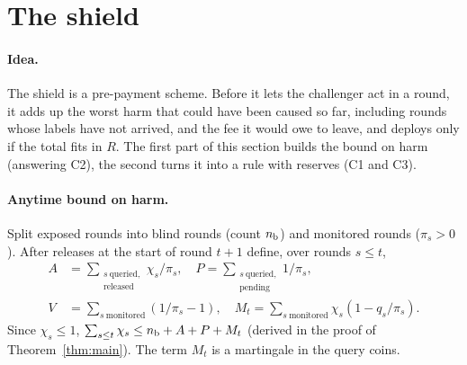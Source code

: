 \documentclass[10pt]{article}
\theoremstyle{plain}
\theoremstyle{definition}
\begin{document}
\section{The shield}\label{sec:method}
\paragraph{Idea.}
The shield is a pre-payment scheme. Before it lets the challenger act in a round, it adds up the worst harm that could have been caused so far, including rounds whose labels have not arrived, and the fee it would owe to leave, and deploys only if the total fits in $R$. The first part of this section builds the bound on harm (answering C2), the second turns it into a rule with reserves (C1 and C3).

\paragraph{Anytime bound on harm.}
Split exposed rounds into blind rounds (count $n_{\rm b}$) and monitored rounds ($\pi_s>0$). After releases at the start of round $t+1$ define, over rounds $s\le t$,
{\small\begin{align*}
A&=\sum_{\substack{s\ \text{queried,}\\ \text{released}}}\!\chi_s/\pi_s,\quad
P=\sum_{\substack{s\ \text{queried,}\\ \text{pending}}}\!1/\pi_s,\\
V&=\sum_{s\ \text{monitored}}(1/\pi_s-1),\quad
M_t=\sum_{s\ \text{monitored}}\chi_s(1-q_s/\pi_s).
\end{align*}}
Since $\chi_s\le1$, $\sum_{s\le t}\chi_s\le n_{\rm b}+A+P+M_t$ (derived in the proof of Theorem~\ref{thm:main}). The term $M_t$ is a martingale in the query coins.
\end{document}
